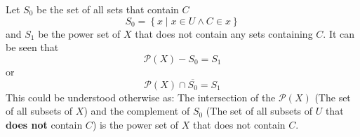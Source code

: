 \documentclass{article}
\begin{document}
\begin{enumerate}[label = \textbf{\alph*)}]
	      Let $ S_0 $ be the set of all sets that contain $ C $
	      \begin{equation*}
		      S_0 = \left\{ x \mid x \in U \land C \in x \right\}
	      \end{equation*}
	      and $ S_1 $ be the power set of $ X $ that does not contain any sets containing $ C $. It can be seen that
	      \begin{equation*}
		      \mathcal{P}(X) - S_0 = S_1
	      \end{equation*}
	      or
	      \begin{equation*}
		      \mathcal{P}(X) \cap \overline{S_0} = S_1
	      \end{equation*}
	      This could be understood otherwise as: The intersection of the $ \mathcal{P}(X) $ (The set of all subsets of $ X $) and the complement of $ S_0 $ (The set of all subsets of $ U $ that \textbf{does not} contain $ C $) is the power set of $ X $ that does not contain $ C $.


\end{enumerate}
\end{document}
